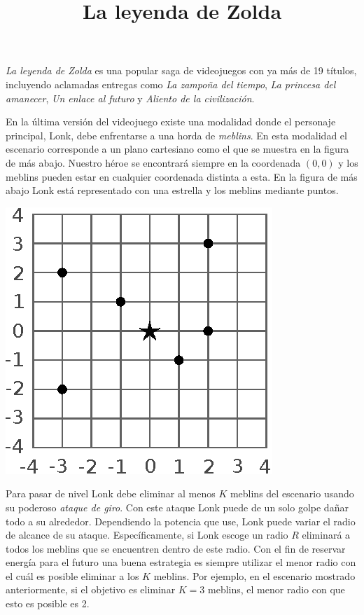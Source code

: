 \documentclass{oci}
\title{La leyenda de Zolda}
\begin{document}
\begin{problemDescription}
  \emph{La leyenda de Zolda} es una popular saga de videojuegos con ya más de 19
  títulos, incluyendo aclamadas entregas como \emph{La zampoña del tiempo},
  \emph{La princesa del amanecer}, \emph{Un enlace al futuro} y \emph{Aliento de
  la civilización}.

  En la última versión del videojuego existe una modalidad donde el personaje
  principal, Lonk, debe enfrentarse a una horda de \emph{meblins}.
  En esta modalidad el escenario corresponde a un plano cartesiano como el que
  se muestra en la figura de más abajo.
  Nuestro héroe se encontrará siempre en la coordenada $(0,0)$ y los meblins
  pueden estar en cualquier coordenada distinta a esta.
  En la figura de más abajo Lonk está representado con una estrella y los meblins
  mediante puntos.
  \vspace{-0.5em}
  \begin{center}
  \includegraphics[scale=0.9]{zolda}
  \end{center}
  \vspace{-0.5em}
  Para pasar de nivel Lonk debe eliminar al menos $K$ meblins del escenario
  usando su poderoso \emph{ataque de giro}.
  Con este ataque Lonk puede de un solo golpe dañar todo a su alrededor.
  Dependiendo la potencia que use, Lonk puede variar el radio de alcance de su
  ataque.
  Específicamente, si Lonk escoge un radio $R$ eliminará a todos los meblins que
  se encuentren dentro de este radio.
  Con el fin de reservar energía para el futuro una buena estrategia es siempre
  utilizar el menor radio con el cuál es posible eliminar a los $K$ meblins.
  Por ejemplo, en el escenario mostrado anteriormente, si el objetivo es eliminar
  $K=3$ meblins, el menor radio con que esto es posible es 2.


\end{problemDescription}
\end{document}
